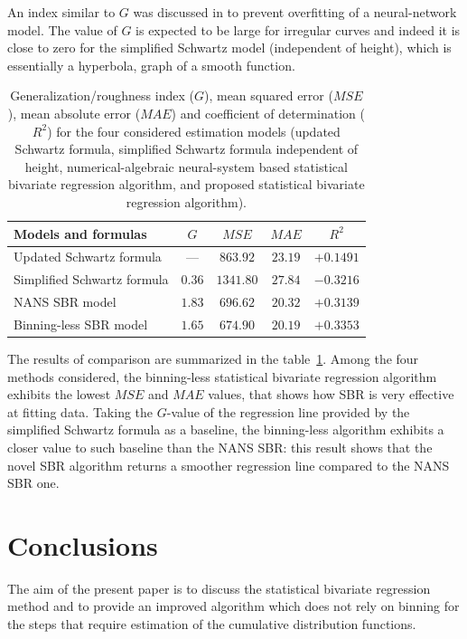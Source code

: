 \documentclass[10pt,final]{siamltex}
\begin{document}
%
An index similar to $\mathit{G}$ was discussed in \cite{bishop} to prevent overfitting of a neural-network model.
The value of $G$ is expected to be large for irregular curves and indeed it is close to zero for the simplified Schwartz model (independent of height), which is essentially a hyperbola, graph of a smooth function.
%
\begin{table}[ht]
  \centering
  \begin{tabular}{|l|c|c|c|c|}
    \hline
    \textbf{Models and formulas}             &$\mathit{G}$  &$\mathit{MSE}$  &$\mathit{MAE}$  &$R^2$    \\
    \hline
    Updated Schwartz formula          & ---  &$863.92$  &$23.19$  &$ +0.1491$  \\
    Simplified Schwartz formula       &$0.36$  &$1341.80$ &$27.84$  &$-0.3216$  \\
    NANS SBR model                  &$1.83$  &$696.62$  &$20.32$  &$ +0.3139$  \\
    Binning-less SBR model           &$1.65$  &$674.90$  &$20.19$  &$ +0.3353$  \\
    \hline
  \end{tabular}
  \caption{Generalization/roughness index ($\mathit{G}$), mean squared error ($\mathit{MSE}$), mean absolute error ($\mathit{MAE}$) and coefficient of determination ($R^2$) for the four considered estimation models (updated Schwartz formula, simplified Schwartz formula independent of height, numerical-algebraic neural-system based statistical bivariate regression algorithm, and proposed statistical bivariate regression algorithm).}
  \label{regstats}
\end{table}

The results of comparison are summarized in the table~\ref{regstats}. Among the four methods considered, the binning-less statistical bivariate regression algorithm exhibits the lowest $\textit{MSE}$ and $\textit{MAE}$ values, that shows how SBR is very effective at fitting data. Taking the $G$-value of the regression line provided by the simplified Schwartz formula as a baseline, the binning-less algorithm exhibits a closer value to such baseline than the NANS SBR: this result shows that the novel SBR algorithm returns a smoother regression line compared to the NANS SBR one.
%
\section{Conclusions}\label{conclusion}
%
The aim of the present paper is to discuss the statistical  bivariate regression method and to provide an improved algorithm which does not rely on binning for the steps that require estimation of the cumulative distribution functions.
\end{document}
